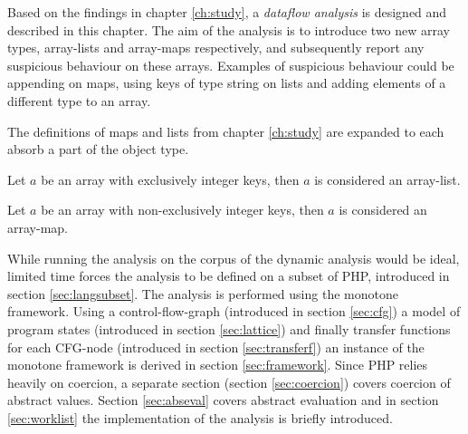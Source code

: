 Based on the findings in chapter \ref{ch:study}, a \emph{dataflow analysis} is designed and described in this chapter. The aim of the analysis is to introduce two new array types, array-lists and array-maps respectively, and subsequently report any suspicious behaviour on these arrays. Examples of suspicious behaviour could be appending on maps, using keys of type string on lists and adding elements of a different type to an array.

The definitions of maps and lists from chapter \ref{ch:study} are expanded to each absorb a part of the object type.

\begin{definition}
Let $a$ be an array with exclusively integer keys, then  $a$ is considered an array-list.
\end{definition}

\begin{definition}
Let $a$ be an array with non-exclusively integer keys, then $a$ is considered an array-map.
\end{definition}

While running the analysis on the corpus of the dynamic analysis would be ideal, limited time forces the analysis to be defined on a subset of PHP, introduced in section \ref{sec:langsubset}. The analysis is performed using the monotone framework. Using a control-flow-graph (introduced in section \ref{sec:cfg}) a model of program states (introduced in section \ref{sec:lattice}) and finally transfer functions for each CFG-node (introduced in section \ref{sec:transferf}) an instance of the monotone framework is derived in section \ref{sec:framework}. Since PHP relies heavily on coercion, a separate section (section \ref{sec:coercion}) covers coercion of abstract values. Section \ref{sec:abseval} covers abstract evaluation and in section \ref{sec:worklist} the implementation of the analysis is briefly introduced.
